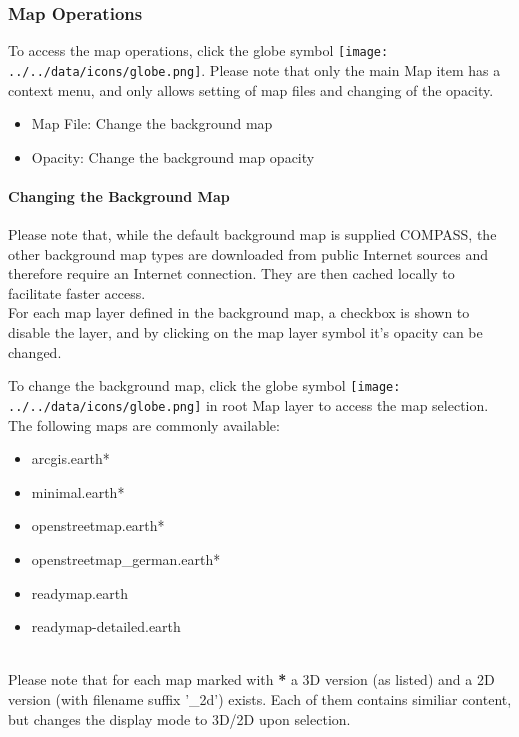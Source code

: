 \subsubsection{Map Operations}
\label{ref:osgview_map_ops}

To access the map operations, click the globe symbol \texttt{[image: ../../data/icons/globe.png]}. Please note that only the main Map item has a context menu, and only allows setting of map files and changing of the opacity.

\begin{itemize}
 \item Map File: Change the background map
 \item Opacity: Change the background map opacity
\end{itemize} 

\paragraph{Changing the Background Map}

Please note that, while the default background map is supplied COMPASS, the other background map types are downloaded from public Internet sources and therefore require an Internet connection. They are then cached locally to facilitate faster access. \\

For each map layer defined in the background map, a checkbox is shown to disable the layer, and by clicking on the map layer symbol it's opacity can be changed.

To change the background map, click the globe symbol \texttt{[image: ../../data/icons/globe.png]} in root Map layer to access the map selection. \\

The following maps are commonly available:

\begin{itemize}
 \item arcgis.earth*
 \item minimal.earth*
 \item openstreetmap.earth*
 \item openstreetmap\_german.earth*
 \item readymap.earth
 \item readymap-detailed.earth
\end{itemize}
 \ \\
 
 Please note that for each map marked with \textbf{*} a 3D version (as listed) and a 2D version (with filename suffix '\_2d') exists. Each of them contains similiar content, but changes the display mode to 3D/2D upon selection. \\

